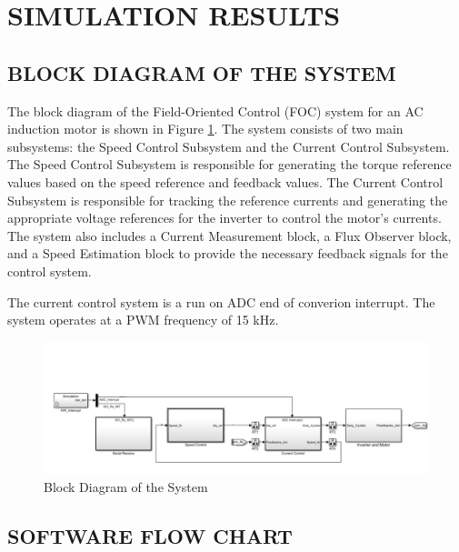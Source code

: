 \section{SIMULATION RESULTS}

\subsection{BLOCK DIAGRAM OF THE SYSTEM}



The block diagram of the Field-Oriented Control (FOC) system for an AC induction motor is shown in Figure \ref{fig:block_diagram}. The system consists of two main subsystems: the Speed Control Subsystem and the Current Control Subsystem. The Speed Control Subsystem is responsible for generating the torque reference values based on the speed reference and feedback values. The Current Control Subsystem is responsible for tracking the reference currents and generating the appropriate voltage references for the inverter to control the motor's currents. The system also includes a Current Measurement block, a Flux Observer block, and a Speed Estimation block to provide the necessary feedback signals for the control system.


The current control system is a run on ADC end of converion interrupt. The system operates at a PWM frequency of 15 kHz.

\begin{figure}[H]
	\centering
	\includegraphics[width=6in]{sections/section3/images/simulation/blockDia.png}
	\caption{Block Diagram of the System}
	\label{fig:block_diagram}
\end{figure}


\subsection{SOFTWARE FLOW CHART}

